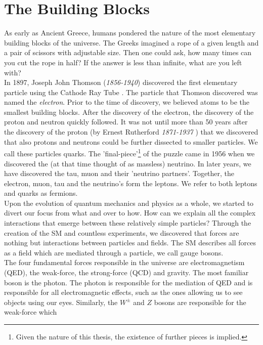 \section{The Building Blocks}
As early as Ancient Greece, humans pondered the nature of the most elementary building blocks of
the universe. The Greeks imagined a rope of a given length and a pair of scissors with adjustable size.
Then one could ask, how many times can you cut the rope in half? If the answer is less than infinite,
what are you left with?
\\
In 1897, Joseph John Thomson (\emph{1856-1940}) discovered the first elementary particle using the Cathode Ray Tube \cite{JJ}. 
The particle that Thomson discovered was named the \emph{electron}. Prior to the time of discovery, we believed atoms to 
be the smallest building blocks. After the discovery of the electron, the discovery of the 
proton and neutron quickly followed. It was not until more than 50 years after the discovery of 
the proton (by Ernest Rutherford \emph{1871-1937} \cite{Rutherfoord}) that we discovered that also protons and neutrons could be further
dissected to smaller particles. We call these particles quarks. The 'final-piece'\footnote{Given the
nature of this thesis, the existence of further pieces is implied.} of the puzzle came
in 1956 \cite{Reines} when we discovered the (at that time thought of as massless) neutrino. In later years,
we have discovered the tau, muon and their 'neutrino partners'. Together, the 
electron, muon, tau and the neutrino's form the leptons. We refer to both leptons and quarks as fermions.
\\
Upon the evolution of quantum mechanics and physics as a whole, we started to divert
our focus from what and over to how. How can we explain all the complex interactions
that emerge between these relatively simple particles? Through the creation of the \ac{SM} and countless 
experiments, we discovered that forces are nothing but interactions between particles and fields.
The \ac{SM} describes all forces as a field which are mediated through a particle, we call gauge bosons. 
\\
The four fundamental forces responsible in the universe are electromagnetism (\ac{QED}), the weak-force, 
the strong-force (\ac{QCD}) and gravity. The most familiar boson is the photon. The photon is responsible 
for the mediation of \ac{QED} and is responsible for all electromagnetic effects, such as the ones allowing
us to see objects using our eyes. Similarly, the $W^{\pm}$ and $Z$ bosons are responsible for the weak-force which
